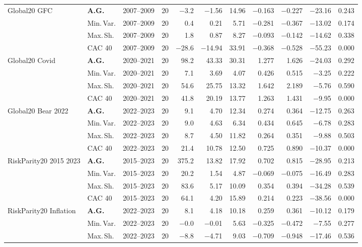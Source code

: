 \begin{longtable}{p{2.6cm} l c c r r r r r r r}
Global20 GFC & \textbf{A.G.} & 2007--2009 & 20 & $-$3.2 & $-$1.56 & 14.96 & $-$0.163 & $-$0.227 & $-$23.16 & 0.243 \\
 & Min.\,Var. & 2007--2009 & 20 & 0.4 & 0.21 & 5.71 & $-$0.281 & $-$0.367 & $-$13.02 & 0.174 \\
 & Max.\,Sh. & 2007--2009 & 20 & 1.8 & 0.87 & 8.27 & $-$0.093 & $-$0.142 & $-$14.62 & 0.338 \\
 & CAC 40 & 2007--2009 & 20 & $-$28.6 & $-$14.94 & 33.91 & $-$0.368 & $-$0.528 & $-$55.23 & 0.000 \\
\midrule
Global20 Covid & \textbf{A.G.} & 2020--2021 & 20 & 98.2 & 43.33 & 30.31 & 1.277 & 1.626 & $-$24.03 & 0.292 \\
 & Min.\,Var. & 2020--2021 & 20 & 7.1 & 3.69 & 4.07 & 0.426 & 0.515 & $-$3.25 & 0.222 \\
 & Max.\,Sh. & 2020--2021 & 20 & 54.6 & 25.75 & 13.32 & 1.642 & 2.189 & $-$5.76 & 0.590 \\
 & CAC 40 & 2020--2021 & 20 & 41.8 & 20.19 & 13.77 & 1.263 & 1.431 & $-$9.95 & 0.000 \\
\midrule
Global20 Bear 2022 & \textbf{A.G.} & 2022--2023 & 20 & 9.1 & 4.70 & 12.34 & 0.274 & 0.364 & $-$12.75 & 0.263 \\
 & Min.\,Var. & 2022--2023 & 20 & 9.0 & 4.63 & 6.34 & 0.434 & 0.645 & $-$6.78 & 0.283 \\
 & Max.\,Sh. & 2022--2023 & 20 & 8.7 & 4.50 & 11.82 & 0.264 & 0.351 & $-$9.88 & 0.503 \\
 & CAC 40 & 2022--2023 & 20 & 21.4 & 10.78 & 12.50 & 0.725 & 0.890 & $-$10.37 & 0.000 \\
\midrule
RiskParity20 2015 2023 & \textbf{A.G.} & 2015--2023 & 20 & 375.2 & 13.82 & 17.92 & 0.702 & 0.815 & $-$28.95 & 0.213 \\
 & Min.\,Var. & 2015--2023 & 20 & 20.2 & 1.54 & 4.87 & $-$0.069 & $-$0.075 & $-$16.49 & 0.283 \\
 & Max.\,Sh. & 2015--2023 & 20 & 83.6 & 5.17 & 10.09 & 0.354 & 0.394 & $-$34.28 & 0.539 \\
 & CAC 40 & 2015--2023 & 20 & 64.1 & 4.20 & 15.89 & 0.214 & 0.223 & $-$38.56 & 0.000 \\
\midrule
RiskParity20 Inflation & \textbf{A.G.} & 2022--2023 & 20 & 8.1 & 4.18 & 10.18 & 0.259 & 0.361 & $-$10.12 & 0.179 \\
 & Min.\,Var. & 2022--2023 & 20 & $-$0.0 & $-$0.01 & 5.63 & $-$0.325 & $-$0.472 & $-$7.55 & 0.277 \\
 & Max.\,Sh. & 2022--2023 & 20 & $-$8.8 & $-$4.71 & 9.03 & $-$0.709 & $-$0.948 & $-$17.46 & 0.536 \\

\end{longtable}
